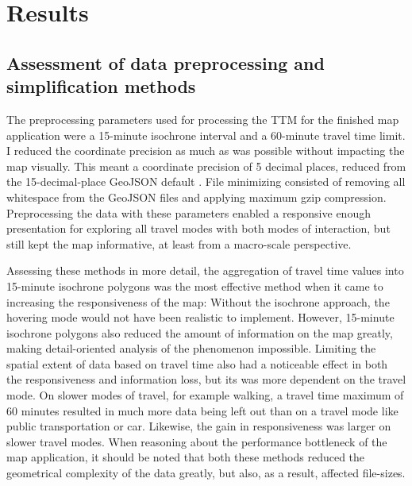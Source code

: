 \section{Results}

\subsection{Assessment of data preprocessing and simplification methods}

The preprocessing parameters used for
processing the TTM for the finished map application were
a 15-minute isochrone interval and a 60-minute travel time limit.
I reduced the coordinate precision as much as
was possible without impacting the map visually.
This meant a coordinate precision of 5 decimal places,
reduced from the 15-decimal-place GeoJSON default \parencite{geojsonspec}.
File minimizing consisted of removing all whitespace from the GeoJSON files
and applying maximum gzip compression.
Preprocessing the data with these parameters
enabled a responsive enough presentation for exploring all travel modes
with both modes of interaction,
but still kept the map informative, at least from a macro-scale perspective.

Assessing these methods in more detail,
the aggregation of travel time values into 15-minute isochrone polygons was the most
effective method when it came to increasing the responsiveness of the map:
Without the isochrone approach,
the hovering mode would not have been realistic to implement.
However, 15-minute isochrone polygons also reduced the amount of information on the map greatly,
making detail-oriented analysis of the phenomenon impossible.
Limiting the spatial extent of data based on travel time also had a noticeable effect
in both the responsiveness and information loss,
but its was more dependent on the travel mode.
On slower modes of travel, for example walking,
a travel time maximum of 60 minutes resulted in
much more data being left out than on a travel mode like public transportation or car.
Likewise, the gain in responsiveness was larger on slower travel modes.
When reasoning about the performance bottleneck of the map application,
it should be noted that both these methods reduced the geometrical complexity of the data greatly,
but also, as a result, affected file-sizes.

